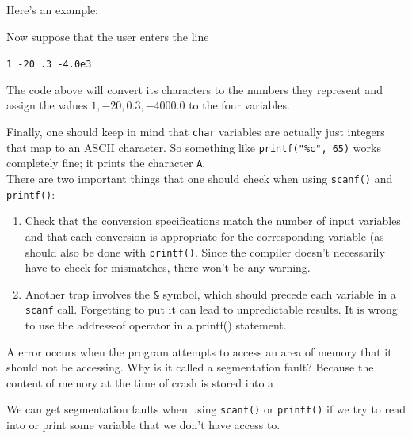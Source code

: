 Here's an example:


\lstset{
caption=Reading Variables
}
\begin{center}

\end{center}

Now suppose that the user enters the line \begin{center}
\verb!1 -20 .3 -4.0e3!.
\end{center}
The code above will convert its characters to the numbers they represent and assign the values $1, -20, 0.3, -4000.0$ to the four variables. 


Finally, one should keep in mind that \verb!char! variables are actually just integers that map to an ASCII character. So something like \verb!printf("%c", 65)! works completely fine; it prints the character \verb!A!. \\

There are two important things that one should check when using \verb!scanf()! and \verb!printf()!: \begin{enumerate}
    \item Check that the conversion specifications match the number of input variables and that each conversion is appropriate for the corresponding variable (as should also be done with \verb!printf()!. Since the compiler doesn't necessarily have to check for mismatches, there won't be any warning.
    \item Another trap involves the \verb!&! symbol, which should precede each variable in a \verb!scanf! call. Forgetting to put it can lead to unpredictable results. It is wrong to use the address-of operator in a printf() statement. 
\end{enumerate}


A  error occurs when the program attempts to access an area of memory that it should not be accessing. Why is it called a segmentation fault? Because the content of memory at the time of crash is stored into a 


We can get segmentation faults when using \verb!scanf()! or \verb!printf()! if we try to read into or print some variable that we don't have access to. 





